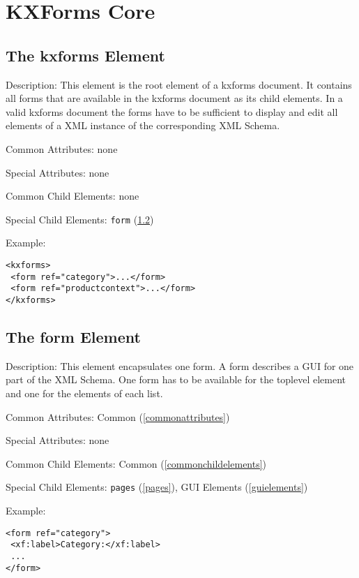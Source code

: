 \pagebreak 
\section{ KXForms Core}

\subsection{ The kxforms Element}
\begin{description}
 \item Description:  This element is the root element of a kxforms document. It contains all forms that are available in the kxforms document as its child elements. In a valid kxforms document the forms have to be sufficient to display and edit all elements of a XML instance of the corresponding XML Schema.

 \item Common Attributes: none

 \item Special Attributes: none

 \item Common Child Elements: none

 \item Special Child Elements: \texttt{form} (\ref{formelement})

 \item Example:
\begin{lstlisting}[caption=kxforms Element]
<kxforms>
 <form ref="category">...</form>
 <form ref="productcontext">...</form>
</kxforms>
\end{lstlisting}
\end{description}




\subsection{ The form Element}
\label{formelement}
\begin{description}
 \item Description: This element encapsulates one form. A form describes a GUI for one part of the XML Schema. One form has to be available for the toplevel element and one for the elements of each list.

 \item Common Attributes: Common (\ref{commonattributes})

 \item Special Attributes: none

 \item Common Child Elements: Common (\ref{commonchildelements})

 \item Special Child Elements: \texttt{pages} (\ref{pages}), GUI Elements (\ref{guielements})

 \item Example:
\begin{lstlisting}[caption=form Element]
<form ref="category">
 <xf:label>Category:</xf:label>
 ...
</form>
\end{lstlisting}
\end{description}





\pagebreak